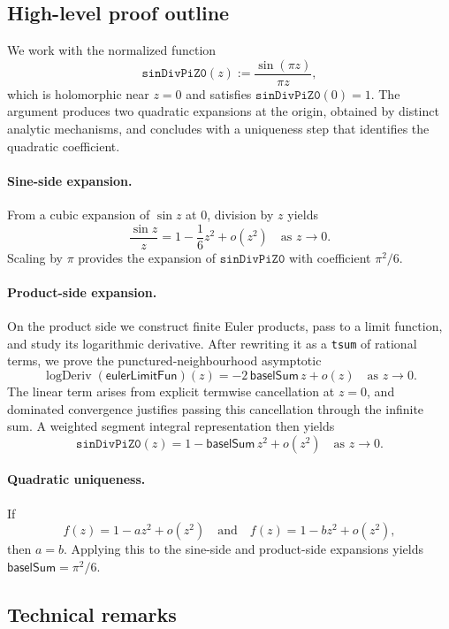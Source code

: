 \documentclass[11pt,a4paper]{article}
\theoremstyle{plain}
\theoremstyle{definition}
\DeclareRobustCommand{\leanid}[1]{\texttt{#1}}
\newcommand{\baselSum}{\ensuremath{\mathsf{baselSum}}}
\newcommand{\sinDivPiZZero}{\leanid{sinDivPiZ0}}
\newcommand{\eulerLimitFun}{\ensuremath{\mathsf{eulerLimitFun}}}
\DeclareMathOperator{\logDeriv}{logDeriv}
\begin{document}
\subsection{High-level proof outline}

We work with the normalized function
\[
\sinDivPiZZero(z) := \frac{\sin(\pi z)}{\pi z},
\]
which is holomorphic near \(z = 0\) and satisfies \(\sinDivPiZZero(0) = 1\). The argument produces two quadratic expansions at the origin, obtained by distinct analytic mechanisms, and concludes with a uniqueness step that identifies the quadratic coefficient.

\paragraph{Sine-side expansion.}
From a cubic expansion of \(\sin z\) at \(0\), division by \(z\) yields
\[
\frac{\sin z}{z} = 1 - \frac{1}{6} z^{2} + o(z^{2})
\quad \text{as } z \to 0.
\]
Scaling by \(\pi\) provides the expansion of \(\sinDivPiZZero\) with coefficient \(\pi^{2}/6\).

\paragraph{Product-side expansion.}
On the product side we construct finite Euler products, pass to a limit function, and study its logarithmic derivative. After rewriting it as a \texttt{tsum} of rational terms, we prove the punctured-neighbourhood asymptotic
\[
\logDeriv(\eulerLimitFun)(z)
= -2\,\baselSum\, z + o(z)
\quad \text{as } z \to 0.
\]
The linear term arises from explicit termwise cancellation at \(z = 0\), and dominated convergence justifies passing this cancellation through the infinite sum. A weighted segment integral representation then yields
\[
\sinDivPiZZero(z)
= 1 - \baselSum\, z^{2} + o(z^{2})
\quad \text{as } z \to 0.
\]

\paragraph{Quadratic uniqueness.}
If
\[
f(z) = 1 - a z^{2} + o(z^{2})
\quad \text{and} \quad
f(z) = 1 - b z^{2} + o(z^{2}),
\]
then \(a = b\). Applying this to the sine-side and product-side expansions yields
\(\baselSum = \pi^{2}/6\).

\subsection{Technical remarks}
\end{document}
